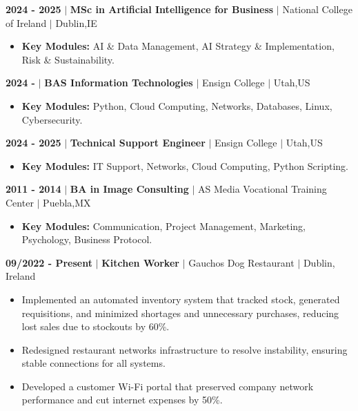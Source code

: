 \documentclass[a4paper,11pt]{article}
\begin{document}
\textbf{2024 - 2025} $|$ \textbf{MSc in Artificial Intelligence for Business} $|$ National College of Ireland $|$ Dublin,IE
\begin{itemize}[leftmargin=1.2em]
\setlength{\itemsep}{-5pt}
\item \textbf{Key Modules:} AI \& Data Management, AI Strategy \& Implementation, Risk \& Sustainability.
\end{itemize}
    
\vspace{0.2cm}
\textbf{2024 - } $|$ \textbf{BAS Information Technologies} $|$ Ensign College $|$ Utah,US

\begin{itemize}[leftmargin=1.2em]
\setlength{\itemsep}{-5pt}
\item \textbf{Key Modules:} Python, Cloud Computing, Networks, Databases, Linux, Cybersecurity.
\end{itemize}

\vspace{0.2cm}
\textbf{2024 - 2025} $|$ \textbf{Technical Support Engineer} $|$ Ensign College $|$ Utah,US

\begin{itemize}[leftmargin=1.2em]
\setlength{\itemsep}{-5pt}
\item \textbf{Key Modules:} IT Support, Networks, Cloud Computing, Python Scripting.
\end{itemize}

\vspace{0.2cm}
\textbf{2011 - 2014} $|$ \textbf{BA in Image Consulting} $|$ AS Media Vocational Training Center $|$ Puebla,MX

\begin{itemize}[leftmargin=1.2em]
\setlength{\itemsep}{-5pt}
\item \textbf{Key Modules:} Communication, Project Management, Marketing, Psychology, Business Protocol.

\end{itemize}


\textbf{09/2022 - Present} $|$ \textbf{Kitchen Worker} $|$ Gauchos Dog Restaurant  $|$ Dublin, Ireland
\begin{itemize}
\setlength{\itemsep}{-5pt}
    \item Implemented an automated inventory system that tracked stock, generated requisitions, and minimized shortages and unnecessary purchases, reducing lost sales due to stockouts by 60\%.
    \item Redesigned restaurant networks infrastructure to resolve instability, ensuring stable connections for all systems.
    \item Developed a customer Wi-Fi portal that preserved company network performance and cut internet expenses by 50\%.
\end{itemize}
\end{document}
